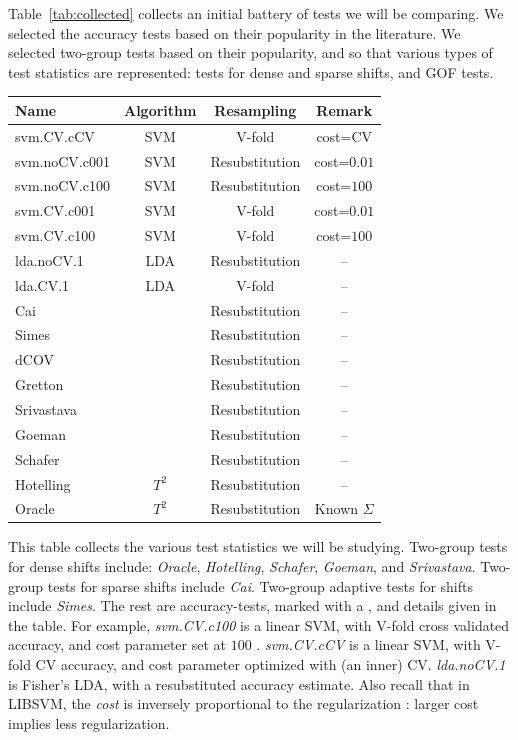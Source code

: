 \documentclass[]{bio}
\begin{document}
\bigskip

Table~\ref{tab:collected} collects an initial battery of tests we will be comparing. 
We selected the accuracy tests based on their popularity in the literature.
We selected two-group tests based on their popularity, and so that various types of test statistics are represented: tests for dense and sparse shifts, and GOF tests. 

\begin{tcolorbox}
	\centering
	\footnotesize
	\begin{tabular}{l|c|c|c}
		Name & Algorithm & Resampling & Remark\\ 
		\hline
		\hline
		\cue svm.CV.cCV 	& SVM & V-fold  & cost=CV \\ 
		\cue svm.noCV.c001 	& SVM & Resubstitution  & cost=$0.01$ \\ 
		\cue svm.noCV.c100 	& SVM & Resubstitution  & cost=$100$ \\ 
		\cue svm.CV.c001	& SVM & V-fold 		    & cost=$0.01$ \\ 
		\cue svm.CV.c100	& SVM & V-fold 		    & cost=$100$ \\ 
		\cue lda.noCV.1 	& LDA & Resubstitution 	&  --\\ 
		\cue lda.CV.1 	& LDA & V-fold 			&  -- \\ 
		Cai & \cite{cai_two-sample_2013} & Resubstitution & -- \\ 
		Simes & \cite{simes1986improved} & Resubstitution & -- \\ 
		dCOV & \cite{szekely2004testing} & Resubstitution & -- \\ 
		Gretton & \cite{gretton_kernel_2012-1} & Resubstitution & -- \\ 
		Srivastava & \cite{srivastava_test_2008} & Resubstitution & -- \\ 
		Goeman & \cite{goeman2006testing} & Resubstitution & -- \\ 
		Schafer & \cite{schafer_shrinkage_2005} & Resubstitution & -- \\ 
		Hotelling & $T^2$ & Resubstitution & -- \\
		Oracle & $T^2$ & Resubstitution & Known $\Sigma$\\ 
	\end{tabular} 
	\captionsetup{type=table}
	\caption{\footnotesize
		This table collects the various test statistics we will be studying. 
		Two-group tests for dense shifts include: \textit{Oracle}, \textit{Hotelling}, \textit{Schafer}, \textit{Goeman}, and \textit{Srivastava}.
		Two-group tests for sparse shifts include \textit{Cai}.
		Two-group adaptive tests for shifts include \textit{Simes}.
		The rest are accuracy-tests, marked with a \cue, and details given in the table. 	
		For example, \textit{svm.CV.c100} is a linear SVM, with V-fold cross validated accuracy, and cost parameter set at $100$ \cite{meyer_e1071:_2015}.
		\textit{svm.CV.cCV} is a linear SVM, with V-fold CV accuracy, and cost parameter optimized with (an inner) CV. 
		\textit{lda.noCV.1} is Fisher's LDA, with a resubstituted accuracy estimate.
		Also recall that in LIBSVM, the \emph{cost} is inversely proportional to the regularization \cite{chang2011libsvm}: larger cost implies less regularization. 
	}
	\label{tab:collected}
\end{tcolorbox}
\end{document}
